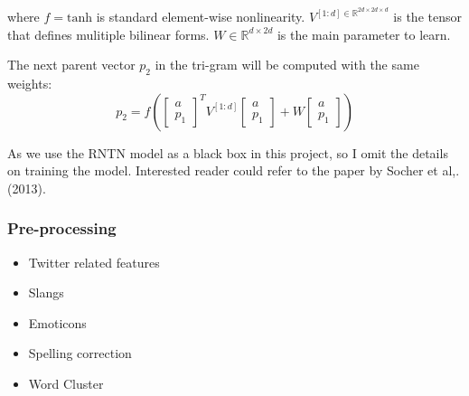 where $f = \textrm{tanh}$ is standard element-wise nonlinearity. $V^{[1:d] \in \mathbb{R}^{2d \times 2d \times d}}$ is the tensor that defines mulitiple bilinear forms. $W \in \mathbb{R}^{d \times 2d}$ is the main parameter to learn. 

The next parent vector $p_2$ in the tri-gram will be computed with the same weights:
\begin{equation*}
p_2 = f \left(  
\begin{bmatrix}
a \\ p_1
\end{bmatrix}^T
V^{[1:d]} 
\begin{bmatrix}
a \\ p_1
\end{bmatrix}
+ W
\begin{bmatrix}
a \\ p_1
\end{bmatrix}
 \right)
\end{equation*}

As we use the RNTN model as a black box in this project, so I omit the details on training the model. Interested reader could refer to the paper by Socher et al,. (2013). 


\subsubsection{Pre-processing}
\begin{itemize}
\item Twitter related features
\item Slangs
\item Emoticons
\item Spelling correction
\item Word Cluster
\end{itemize}



